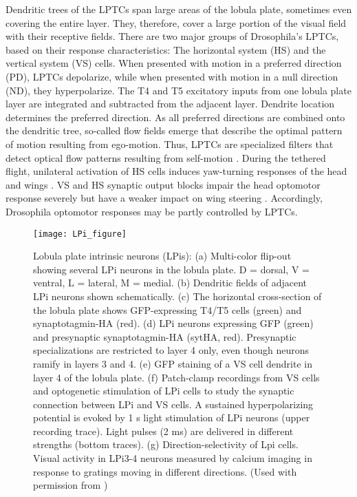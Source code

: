 Dendritic trees of the LPTCs span large areas of the lobula plate, sometimes even covering the entire layer. They, therefore, cover a large portion of the visual field with their receptive fields. There are two major groups of Drosophila's LPTCs, based on their response characteristics: The horizontal system (HS) and the vertical system (VS) cells. When presented with motion in a preferred direction (PD), LPTCs depolarize, while when presented with motion in a null direction (ND), they hyperpolarize. The T4 and T5 excitatory inputs from one lobula plate layer are integrated and subtracted from the adjacent layer. Dendrite location determines the preferred direction. As all preferred directions are combined onto the dendritic tree, so-called flow fields emerge that describe the optimal pattern of motion resulting from ego-motion. Thus, LPTCs are specialized filters that detect optical flow patterns resulting from self-motion \parencite{Krapp1996}. During the tethered flight, unilateral activation of HS cells induces yaw-turning responses of the head and wings \parencite{Haikala2013}. VS and HS synaptic output blocks impair the head optomotor response severely but have a weaker impact on wing steering \parencite{Kim2017}. Accordingly, Drosophila optomotor responses may be partly controlled by LPTCs.

\begin{figure}
\centering
\hspace*{-1cm} 
\texttt{[image: LPi\_figure]}
\caption[Lobula plate intrinsic neurons (LPis)] {Lobula plate intrinsic neurons (LPis): (a) Multi-color flip-out showing several LPi neurons in the lobula plate. D = dorsal, V = ventral, L = lateral, M = medial. (b) Dendritic fields of adjacent LPi neurons shown schematically. (c) The horizontal cross-section of the lobula plate shows GFP-expressing T4/T5 cells (green) and synaptotagmin-HA (red). (d) LPi neurons expressing GFP (green) and presynaptic synaptotagmin-HA (sytHA, red). Presynaptic specializations are restricted to layer 4 only, even though neurons ramify in layers 3 and 4. (e) GFP staining of a VS cell dendrite in layer 4 of the lobula plate. (f) Patch-clamp recordings from VS cells and optogenetic stimulation of LPi cells to study the synaptic connection between LPi and VS cells. A sustained hyperpolarizing potential is evoked by 1 s light stimulation of LPi neurons (upper recording trace). Light pulses (2 ms) are delivered in different strengths (bottom traces). (g) Direction-selectivity of Lpi cells. Visual activity in LPi3-4 neurons measured by calcium imaging in response to gratings moving in different directions. (Used with permission from \parencite{Borst2020b})} 
\label{fig:lpifigure}
\end{figure}


